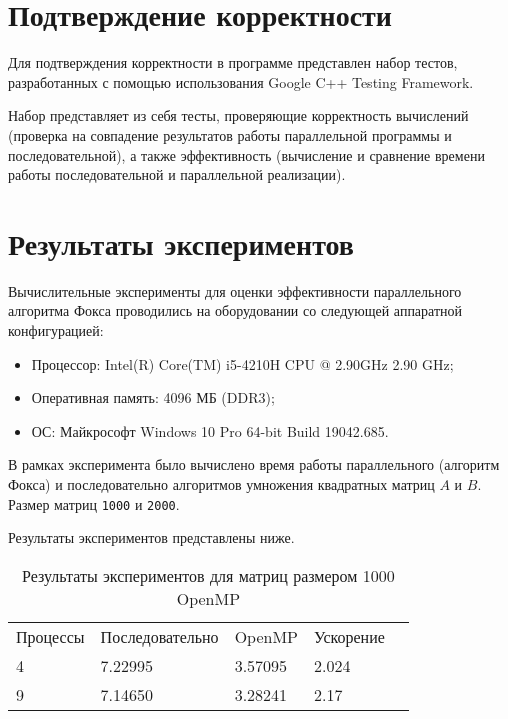 \documentclass{report}
\begin{document}
\section*{Подтверждение корректности}
Для подтверждения корректности в программе представлен набор тестов, разработанных с помощью использования Google C++ Testing Framework.
\par Набор представляет из себя тесты, проверяющие корректность вычислений (проверка на совпадение результатов работы параллельной программы и последовательной), а также эффективность (вычисление и сравнение времени работы последовательной и параллельной реализации).
\newpage

\section*{Результаты экспериментов}
Вычислительные эксперименты для оценки эффективности параллельного алгоритма Фокса проводились на оборудовании со следующей аппаратной конфигурацией:

\begin{itemize}
\item Процессор: Intel(R) Core(TM) i5-4210H CPU @ 2.90GHz   2.90 GHz;
\item Оперативная память: 4096 МБ (DDR3);
\item ОС: Майкрософт Windows 10 Pro 64-bit Build 19042.685.
\end{itemize}

\par В рамках эксперимента было вычислено время работы параллельного (алгоритм Фокса)
и последовательно алгоритмов умножения квадратных матриц {\itshape $A$} и {\itshape $B$}. Размер матриц \verb|1000| и \verb|2000|.
\par Результаты экспериментов представлены ниже.

\begin{table}[!h]
\caption{Результаты экспериментов для матриц размером 1000 OpenMP}
\centering
\begin{tabular}{lllll}
Процессы & Последовательно & OpenMP   & Ускорение  \\
4        & 7.22995         & 3.57095  & 2.024       \\
9        & 7.14650         & 3.28241  & 2.17       \\
\end{tabular}
\end{table}
\end{document}
